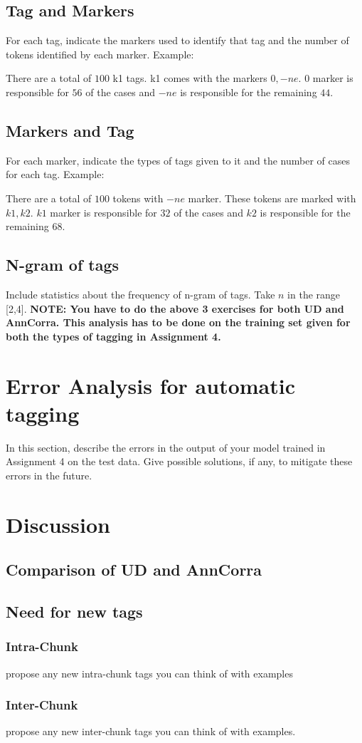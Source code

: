 \documentclass[a4 paper]{article}
\begin{document}
\subsection{Tag and Markers}

For each tag, indicate the markers used to identify that tag and the number of tokens identified by each marker. Example:

There are a total of $100$ k1 tags. k1 comes with the markers $0, -ne$. $0$ marker is responsible for $56$ of the cases and $-ne$ is responsible for the remaining $44$.

\subsection{Markers and Tag}

For each marker, indicate the types of tags given to it and the number of cases for each tag. Example:

There are a total of $100$ tokens with $-ne$ marker. These tokens are marked with $k1, k2$. $k1$ marker is responsible for $32$ of the cases and $k2$ is responsible for the remaining $68$.

\subsection{N-gram of tags}
Include statistics about the frequency of n-gram of tags. Take $n$ in the range [2,4].
\newline \newline \newline
\textbf{NOTE: You have to do the above 3 exercises for both UD and AnnCorra. This analysis has to be done on the training set given for both the types of tagging in Assignment 4.}

\section{Error Analysis for automatic tagging}
In this section, describe the errors in the output of your model trained in Assignment 4 on the test data. Give possible solutions, if any, to mitigate these errors in the future. 

\section{Discussion}

\subsection{Comparison of UD and AnnCorra}
\subsection{Need for new tags}
\subsubsection{Intra-Chunk}
propose any new intra-chunk tags you can think of with examples
\subsubsection{Inter-Chunk}
propose any new inter-chunk tags you can think of with examples.
\end{document}
